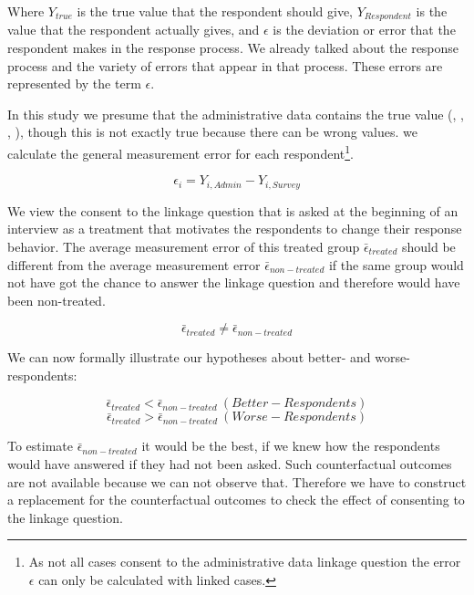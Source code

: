 Where \(Y_{true}\) is the true value that the respondent should give, \(Y_{Respondent}\) is the value that the respondent actually gives, and \(\epsilon\) is the deviation or error that the respondent makes in the response process. We already talked about the response process and the variety of errors that appear in that process. These errors are represented by the term \( \epsilon\).

In this study we presume that the administrative data contains the true value (\cite{Davernetal08}, \cite{Kreuteretal08}, \cite{Kreuteretal10}, \cite{Sakshaugetal10}), though this is not exactly true because there can be wrong values. we calculate the general measurement error for each respondent\footnote{As not all cases consent to the administrative data linkage question the error \(\epsilon\) can only be calculated with linked cases.}.

\begin{equation}
\epsilon_i = Y_{i, Admin} - Y_{i, Survey}
\label{eq:generalME}
\end{equation}

We view the consent to the linkage question that is asked at the beginning of an interview as a treatment that motivates the respondents to change their response behavior. The average measurement error of this treated group \(\bar{\epsilon}_{treated}\) should be different from the average measurement error \(\bar{\epsilon}_{non-treated}\) if the same group would not have got the chance to answer the linkage question and therefore would have been non-treated.

\begin{equation}
\bar{\epsilon}_{treated} \neq \bar{\epsilon}_{non-treated}
\label{eq:hyp_epsi}
\end{equation}

We can now formally illustrate our hypotheses about better- and worse-respondents:

\begin{equation}
\bar{\epsilon}_{treated} < \bar{\epsilon}_{non-treated} \ (Better-Respondents)
\label{eq:hyp_better}
\end{equation}
\begin{equation}
\bar{\epsilon}_{treated} > \bar{\epsilon}_{non-treated}  \ (Worse-Respondents)
\label{eq:hyp_worse}
\end{equation}

To estimate \(\bar{\epsilon}_{non-treated}\) it would be the best, if we knew how the respondents would have answered if they had not been asked. Such counterfactual outcomes are not available because we can not observe that. Therefore we have to construct a replacement for the counterfactual outcomes to check the effect of consenting to the linkage question.

